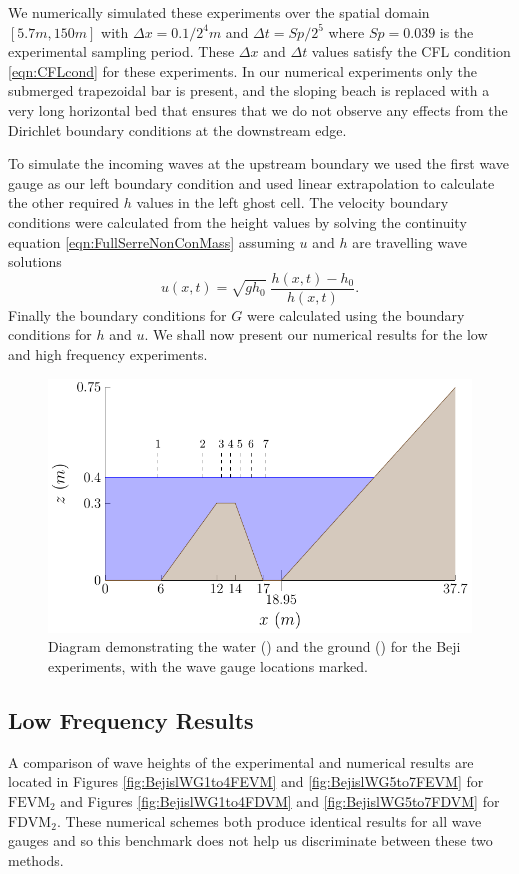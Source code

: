 We numerically simulated these experiments over the spatial domain $\left[5.7m,150m\right]$ with $\Delta x = 0.1 / 2^4 m$ and $\Delta t = Sp / 2^5$ where $Sp = 0.039$ is the experimental sampling period. These $\Delta x$ and $\Delta t$ values satisfy the CFL condition \eqref{eqn:CFLcond} for these experiments. In our numerical experiments only the submerged trapezoidal bar is present, and the sloping beach is replaced with a very long horizontal bed that ensures that we do not observe any effects from the Dirichlet boundary conditions at the downstream edge.  

To simulate the incoming waves at the upstream boundary we used the first wave gauge as our left boundary condition and used linear extrapolation to calculate the other required $h$ values in the left ghost cell. The velocity boundary conditions were calculated from the height values by solving the continuity equation \eqref{eqn:FullSerreNonConMass} assuming $u$ and $h$ are travelling wave solutions
\begin{equation*}
u(x,t) = \sqrt{g h_0} \; \dfrac{h(x,t) - h_0}{h(x,t)}.
\end{equation*}
Finally the boundary conditions for $G$ were calculated using the boundary conditions for $h$ and $u$. We shall now present our numerical results for the low and high frequency experiments.
%
\begin{figure}
	\centering
		\includegraphics[width=\textwidth]{./chp6/figures/Experiment/Beji/BejiTank.pdf}
	\caption{Diagram demonstrating the water () and the ground  () for the Beji experiments, with the wave gauge locations marked.}
	\label{fig:BejiWT}
\end{figure}
%
\subsection{Low Frequency Results}
A comparison of wave heights of the experimental and numerical results are located in Figures \ref{fig:BejislWG1to4FEVM} and \ref{fig:BejislWG5to7FEVM} for $\text{FEVM}_2$ and Figures \ref{fig:BejislWG1to4FDVM} and \ref{fig:BejislWG5to7FDVM} for $\text{FDVM}_2$. These numerical schemes both produce identical results for all wave gauges and so this benchmark does not help us discriminate between these two methods. 

